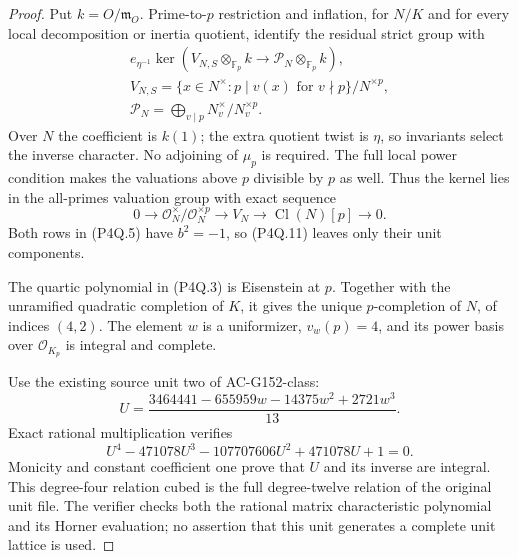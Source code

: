 \begin{proof}
Put $k=O/\mathfrak m_O$.
Prime-to-$p$ restriction and inflation, for $N/K$ and for every
local decomposition or inertia quotient, identify the residual
strict group with
\[
 \begin{gathered}
 e_{\eta^{-1}}\ker\left(V_{N,S}\otimes_{\mathbb F_p}k
                        \longrightarrow\mathcal P_N\otimes_{\mathbb F_p}k\right),\\
 V_{N,S}=\{x\in N^\times:p\mid v(x)\text{ for }v\nmid p\}/N^{\times p},\\
 \mathcal P_N=\bigoplus_{v\mid p}N_v^\times/N_v^{\times p}.
 \end{gathered}
 \tag{P4Q.12}
\]
Over $N$ the coefficient is $k(1)$; the extra quotient twist
is $\eta$, so invariants select the inverse character.
No adjoining of $\mu_p$ is required.
The full local power condition makes the valuations above $p$
divisible by $p$ as well.  Thus the kernel lies in the all-primes
valuation group with exact sequence
\[
 0\longrightarrow\mathcal O_N^\times/\mathcal O_N^{\times p}
 \longrightarrow V_N\longrightarrow\operatorname{Cl}(N)[p]
 \longrightarrow0.
 \tag{P4Q.13}
\]
Both rows in (P4Q.5) have $b^2=-1$, so (P4Q.11) leaves only
their unit components.

The quartic polynomial in (P4Q.3) is Eisenstein at $p$.
Together with the unramified quadratic completion of $K$, it
gives the unique $p$-completion of $N$, of indices $(4,2)$.
The element $w$ is a uniformizer, $v_w(p)=4$, and its power
basis over $\mathcal O_{K_p}$ is integral and complete.

Use the existing source unit two of AC-G152-class:
\[
 U=\frac{3464441-655959w-14375w^2+2721w^3}{13}.
 \tag{P4Q.14}
\]
Exact rational multiplication verifies
\[
                   U^4-471078U^3-107707606U^2+471078U+1=0.
 \tag{P4Q.15}
\]
Monicity and constant coefficient one prove that $U$ and its
inverse are integral.  This degree-four relation cubed is the
full degree-twelve relation of the original unit file.
The verifier checks both the rational matrix characteristic
polynomial and its Horner evaluation; no assertion that this
unit generates a complete unit lattice is used.


\end{proof}
